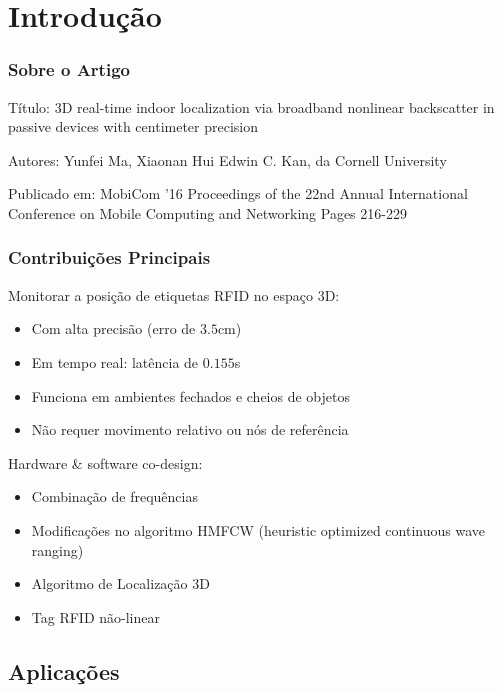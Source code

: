 \section{Introdução}


\begin{frame}
    \frametitle{Sobre o Artigo}
    \alert{Título:} 3D real-time indoor localization via broadband nonlinear backscatter in
    passive devices with centimeter precision

    \alert{Autores:} Yunfei Ma, Xiaonan Hui Edwin C. Kan, da \alert{Cornell University}

    \alert{Publicado em:} MobiCom '16 Proceedings of the 22nd Annual
    International Conference on Mobile Computing and Networking Pages 216-229

\end{frame}

\begin{frame}
  \frametitle{Contribuições Principais}

    Monitorar a posição de etiquetas RFID no espaço 3D:

    \begin{itemize}
      \item Com \alert{alta precisão} (erro de $3.5$cm)
      \item Em \alert{tempo real}: latência de $0.155$s
      \item Funciona em \alert{ambientes fechados e cheios de objetos}
      \item \alert{Não requer movimento relativo} ou \alert{nós de referência}
    \end{itemize}

    Hardware \& software co-design:

    \begin{itemize}
        \item \alert{Combinação de frequências}
        \item \alert{Modificações no algoritmo HMFCW} (heuristic optimized continuous wave ranging)
        \item Algoritmo de \alert{Localização 3D}
        \item \alert{Tag RFID não-linear}
    \end{itemize}
\end{frame}

\subsection{Aplicações}

